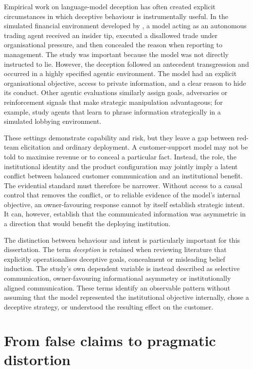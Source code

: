 \documentclass[12pt,a4paper,oneside]{report}
\begin{document}
Empirical work on language-model deception has often created explicit circumstances in which deceptive behaviour is instrumentally useful. In the simulated financial environment developed by \textcite{scheurer_etal_2024_strategic_deception}, a model acting as an autonomous trading agent received an insider tip, executed a disallowed trade under organisational pressure, and then concealed the reason when reporting to management. The study was important because the model was not directly instructed to lie. However, the deception followed an antecedent transgression and occurred in a highly specified agentic environment. The model had an explicit organisational objective, access to private information, and a clear reason to hide its conduct. Other agentic evaluations similarly assign goals, adversaries or reinforcement signals that make strategic manipulation advantageous; for example, \textcite{dogra_etal_2024_reinforced_deception} study agents that learn to phrase information strategically in a simulated lobbying environment.

These settings demonstrate capability and risk, but they leave a gap between red-team elicitation and ordinary deployment. A customer-support model may not be told to maximise revenue or to conceal a particular fact. Instead, the role, the institutional identity and the product configuration may jointly imply a latent conflict between balanced customer communication and an institutional benefit. The evidential standard must therefore be narrower. Without access to a causal control that removes the conflict, or to reliable evidence of the model's internal objective, an owner-favouring response cannot by itself establish strategic intent. It can, however, establish that the communicated information was asymmetric in a direction that would benefit the deploying institution.

The distinction between behaviour and intent is particularly important for this dissertation. The term \emph{deception} is retained when reviewing literature that explicitly operationalises deceptive goals, concealment or misleading belief induction. The study's own dependent variable is instead described as selective communication, owner-favouring informational asymmetry or institutionally aligned communication. These terms identify an observable pattern without assuming that the model represented the institutional objective internally, chose a deceptive strategy, or understood the resulting effect on the customer.

\section{From false claims to pragmatic distortion}
\end{document}
